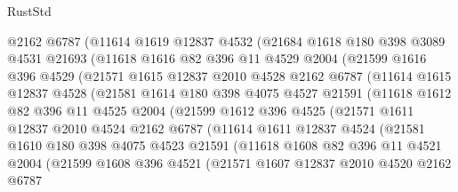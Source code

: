 \begin{lexlean}{RustStd}
\begin{coremodule}
        @2162
        @6787
        (@11614
          @1619
          @12837
          @4532
          (@21684
            @1618
            @180
            @398
            @3089
            @4531
            @21693
            (@11618
              @1616
              @82
              @396
              @11
              @4529
              @2004
              (@21599
                @1616
                @396
                @4529
                (@21571
                  @1615
                  @12837
                  @2010
                  @4528
                  @2162
                  @6787
                  (@11614
                    @1615
                    @12837
                    @4528
                    (@21581
                      @1614
                      @180
                      @398
                      @4075
                      @4527
                      @21591
                      (@11618
                        @1612
                        @82
                        @396
                        @11
                        @4525
                        @2004
                        (@21599
                          @1612
                          @396
                          @4525
                          (@21571
                            @1611
                            @12837
                            @2010
                            @4524
                            @2162
                            @6787
                            (@11614
                              @1611
                              @12837
                              @4524
                              (@21581
                                @1610
                                @180
                                @398
                                @4075
                                @4523
                                @21591
                                (@11618
                                  @1608
                                  @82
                                  @396
                                  @11
                                  @4521
                                  @2004
                                  (@21599
                                    @1608
                                    @396
                                    @4521
                                    (@21571
                                      @1607
                                      @12837
                                      @2010
                                      @4520
                                      @2162
                                      @6787

\end{coremodule}
\end{lexlean}
